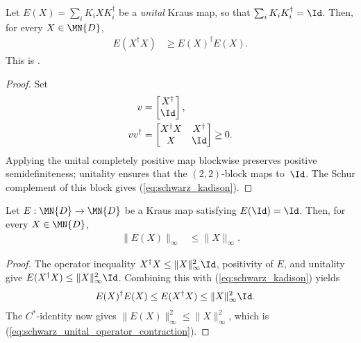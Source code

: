 \begin{theorem}\label{thm:kadison_schwarz}
    \leanok
    Let $E(X) = \sum_i K_i X K_i^\dagger$ be a \emph{unital}
    Kraus map, so that $\sum_i K_i K_i^\dagger = \Id$.
    Then, for every $X \in \MN{D}$,
    \begin{align}
        E(X^\dagger X)
        &\geq E(X)^\dagger E(X).
        \label{eq:schwarz_kadison}
    \end{align}
    This is \cite[Equation~(5.2)]{Wolf2012Quantum}.
\end{theorem}

\begin{proof}
    \leanok
    Set
    \begin{align}
        v
        &=
        \begin{bmatrix}
            X^\dagger\\
            \Id
        \end{bmatrix},
        \notag\\
        vv^\dagger
        &=
        \begin{bmatrix}
            X^\dagger X & X^\dagger\\
            X & \Id
        \end{bmatrix}
        \geq 0.
        \notag
    \end{align}
    Applying the unital completely positive map blockwise preserves positive
    semidefiniteness; unitality ensures that the $(2,2)$-block maps to~$\Id$.
    The Schur complement of this block gives
    (\ref{eq:schwarz_kadison}).
\end{proof}

\begin{theorem}
    \label{thm:unital_kraus_operator_norm_contraction}
    \leanok
    Let $E:\MN{D}\to\MN{D}$ be a Kraus map satisfying $E(\Id)=\Id$.
    Then, for every $X\in\MN{D}$,
    \begin{align}
        \|E(X)\|_\infty
        &\leq \|X\|_\infty.
        \label{eq:schwarz_unital_operator_contraction}
    \end{align}
\end{theorem}

\begin{proof}
    \leanok
    The operator inequality
    $X^\dagger X\leq\|X\|_\infty^2\Id$, positivity of $E$, and unitality give
    $E(X^\dagger X)\leq\|X\|_\infty^2\Id$. Combining this with
    (\ref{eq:schwarz_kadison}) yields
    \begin{align}
        E(X)^\dagger E(X)
        &\leq E(X^\dagger X)
        \leq \|X\|_\infty^2\Id.
        \notag
    \end{align}
    The $C^*$-identity now gives
    $\|E(X)\|_\infty^2\leq\|X\|_\infty^2$, which is
    (\ref{eq:schwarz_unital_operator_contraction}).
\end{proof}

